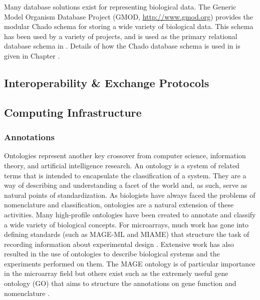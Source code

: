 Many database solutions exist for representing biological data.  The Generic
Model Organism Database Project (GMOD, \url{http://www.gmod.org}) provides the
modular Chado schema \cite{chado} for storing a wide variety of biological
data.  This schema has been used by a variety of projects, and is used as the
primary relational database schema in \dbthesis.  Details of how the Chado
database schema is used in \dbthesis is given in Chapter \dbthesis.

\subsection{Interoperability \& Exchange Protocols}
\label{Protocol}

\subsection{Computing Infrastructure}
\label{Computing Infrastructure}









\subsubsection{Annotations}

Ontologies represent another key crossover from computer science, information
theory, and artificial intelligence research.  An ontology is a system of
related terms that is intended to encapsulate the classification of a system.
They are a way of describing and understanding a facet of the world and, as such,
serve as natural points of standardization.  As biologists have always faced
the problems of nomenclature and classification, ontologies are a natural
extension of these activities.  Many high-profile ontologies have been created
to annotate and classify a wide variety of biological concepts.  For
microarrays, much work has gone into defining standards (such as MAGE-ML and
MIAME) that structure the task of recording information about experimental
design \cite{miame,mage}. Extensive work has also resulted in the use of
ontologies to describe biological systems and the experiments performed on
them.  The MAGE ontology is of particular importance in the microarray field
but others exist such as the extremely useful gene ontology (GO) that aims to
structure the annotations on gene function and nomenclature \cite{mo,go}.

